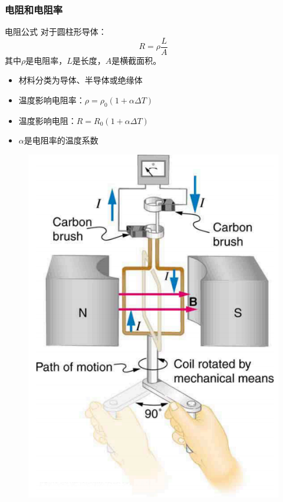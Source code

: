\documentclass{beamer}
\begin{document}
\begin{frame}
    \frametitle{电阻和电阻率}
    \begin{block}{电阻公式}
        对于圆柱形导体：
        \[ R = \rho\frac{L}{A} \]
        其中$\rho$是电阻率，$L$是长度，$A$是横截面积。
    \end{block}
    \begin{itemize}
        \item 材料分类为导体、半导体或绝缘体
        \item 温度影响电阻率：$\rho = \rho_0(1 + \alpha\Delta T)$
        \item 温度影响电阻：$R = R_0(1 + \alpha\Delta T)$
        \item $\alpha$是电阻率的温度系数
    \end{itemize}
\end{frame}
\begin{frame}{}
    \begin{figure}
        \centering
        \includegraphics[width=1\linewidth]{phys12-circuits-rc-circuit-diagram.png}
    \end{figure}
\end{frame}
\end{document}
